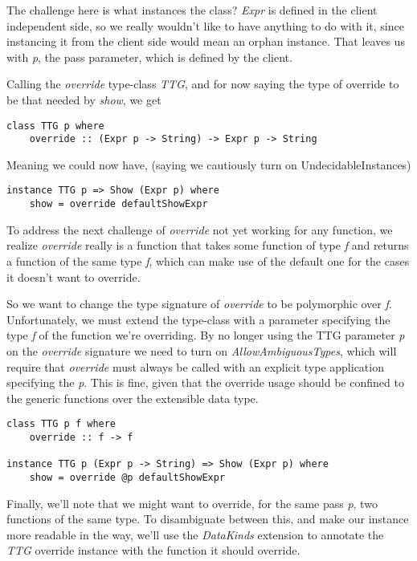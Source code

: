 \documentclass{article}
\begin{document}
The challenge here is what instances the class? \emph{Expr} is defined in the
client independent side, so we really wouldn't like to have anything to do with
it, since instancing it from the client side would mean an orphan instance. That
leaves us with \emph{p}, the pass parameter, which is defined by the client.

Calling the \emph{override} type-class \emph{TTG}, and for now saying the type
of override to be that needed by \emph{show}, we get

\begin{lstlisting}
class TTG p where
    override :: (Expr p -> String) -> Expr p -> String
\end{lstlisting}

Meaning we could now have, (saying we cautiously turn on UndecidableInstances)
\begin{lstlisting}
instance TTG p => Show (Expr p) where
    show = override defaultShowExpr
\end{lstlisting}

To address the next challenge of \emph{override} not yet working for any
function, we realize \emph{override} really is a function that takes some
function of type \emph{f} and returns a function of the same type \emph{f},
which can make use of the default one for the cases it doesn't want to override.

So we want to change the type signature of \emph{override} to be polymorphic
over \emph{f}. Unfortunately, we must extend the type-class with a parameter
specifying the type \emph{f} of the function we're overriding. By no longer
using the TTG parameter \emph{p} on the \emph{override} signature we need to
turn on \emph{AllowAmbiguousTypes}, which will require that \emph{override}
must always be called with an explicit type application specifying the \emph{p}.
This is fine, given that the override usage should be confined to the generic
functions over the extensible data type.

\begin{lstlisting}
class TTG p f where
    override :: f -> f

instance TTG p (Expr p -> String) => Show (Expr p) where
    show = override @p defaultShowExpr
\end{lstlisting}

Finally, we'll note that we might want to override, for the same pass \emph{p},
two functions of the same type. To disambiguate between this, and make our
instance more readable in the way, we'll use the \emph{DataKinds} extension to
annotate the \emph{TTG} override instance with the function it should override.
\end{document}
